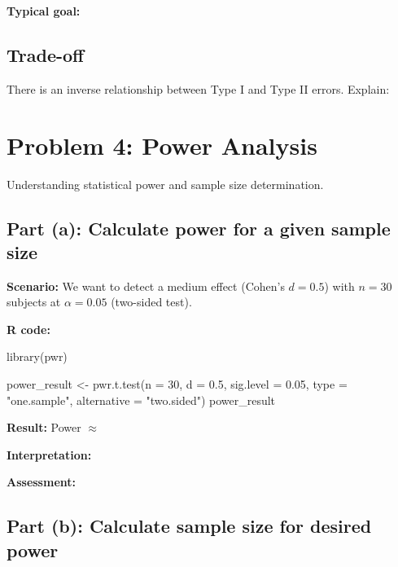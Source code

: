 \documentclass[11pt]{article}
\begin{document}
\vspace{1cm}

\textbf{Typical goal:}

\vspace{1cm}

\subsection*{Trade-off}

There is an inverse relationship between Type I and Type II errors. Explain:

\vspace{3cm}

\pagebreak

\section*{Problem 4: Power Analysis}

Understanding statistical power and sample size determination.

\subsection*{Part (a): Calculate power for a given sample size}

\textbf{Scenario:} We want to detect a medium effect (Cohen's $d = 0.5$) with $n = 30$ subjects at $\alpha = 0.05$ (two-sided test).

\textbf{R code:}
\begin{rcode}
library(pwr)

power_result <- pwr.t.test(n = 30,
                            d = 0.5,
                            sig.level = 0.05,
                            type = "one.sample",
                            alternative = "two.sided")
power_result
\end{rcode}

\textbf{Result:} Power $\approx$

\vspace{1cm}

\textbf{Interpretation:}

\vspace{2cm}

\textbf{Assessment:}

\vspace{2cm}

\subsection*{Part (b): Calculate sample size for desired power}
\end{document}
